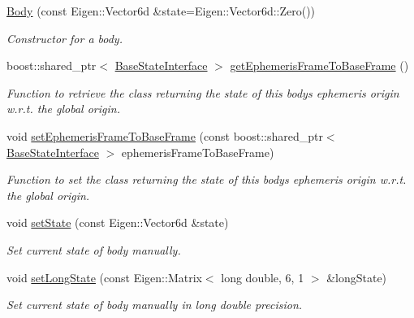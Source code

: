 \begin{DoxyCompactItemize}
\item 
\hyperlink{classtudat_1_1simulation__setup_1_1Body_a802232493506b5fc4956779e74468f06}{Body} (const Eigen\+::\+Vector6d \&state=Eigen\+::\+Vector6d\+::\+Zero())
\begin{DoxyCompactList}\small\item\em Constructor for a body. \end{DoxyCompactList}\item 
boost\+::shared\+\_\+ptr$<$ \hyperlink{classtudat_1_1simulation__setup_1_1BaseStateInterface}{Base\+State\+Interface} $>$ \hyperlink{classtudat_1_1simulation__setup_1_1Body_a4dbe4ca3a89d67dfa7da256ad5343b68}{get\+Ephemeris\+Frame\+To\+Base\+Frame} ()
\begin{DoxyCompactList}\small\item\em Function to retrieve the class returning the state of this body\textquotesingle{}s ephemeris origin w.\+r.\+t. the global origin. \end{DoxyCompactList}\item 
void \hyperlink{classtudat_1_1simulation__setup_1_1Body_a6f30112a19952498a20d482ac5632012}{set\+Ephemeris\+Frame\+To\+Base\+Frame} (const boost\+::shared\+\_\+ptr$<$ \hyperlink{classtudat_1_1simulation__setup_1_1BaseStateInterface}{Base\+State\+Interface} $>$ ephemeris\+Frame\+To\+Base\+Frame)
\begin{DoxyCompactList}\small\item\em Function to set the class returning the state of this body\textquotesingle{}s ephemeris origin w.\+r.\+t. the global origin. \end{DoxyCompactList}\item 
void \hyperlink{classtudat_1_1simulation__setup_1_1Body_a157e498e30d7c90dd7a4b73c719fd5d5}{set\+State} (const Eigen\+::\+Vector6d \&state)
\begin{DoxyCompactList}\small\item\em Set current state of body manually. \end{DoxyCompactList}\item 
void \hyperlink{classtudat_1_1simulation__setup_1_1Body_ae5f634a6c751ad8922dc6e6662f6a502}{set\+Long\+State} (const Eigen\+::\+Matrix$<$ long double, 6, 1 $>$ \&long\+State)
\begin{DoxyCompactList}\small\item\em Set current state of body manually in long double precision. \end{DoxyCompactList}\item 

\end{DoxyCompactItemize}
